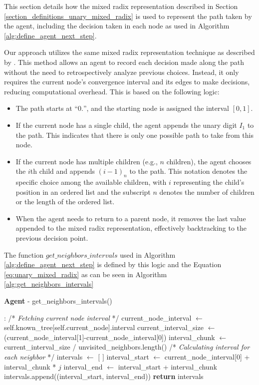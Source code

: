 This section details how the mixed radix representation described in Section \ref{section_definitions_unary_mixed_radix}
is used to represent the path taken by the agent, including the decision taken in each node as used in Algorithm \ref{alg:define_agent_next_step}.

Our approach utilizes the same mixed radix representation technique as described by .
This method allows an agent to record each decision made along the path without the need to retrospectively analyze previous choices.
Instead, it only requires the current node's convergence interval and its edges to make decisions, reducing computational overhead. This is based on the following logic:

\begin{itemize}
    \item The path starts at ``$0.$'', and the starting node is assigned the interval $[0,1]$.
    \item If the current node has a single child, the agent appends the unary digit $I_1$ to the path. This indicates that there is only one possible path to take from this node.
    \item If the current node has multiple children (e.g., $n$ children), the agent chooses the $i$th child and appends $(i-1)_n$ to the path. This notation denotes the specific choice among the available children, with $i$ representing the child's position in an ordered list and the subscript $n$ denotes the number of children or the length of the ordered list.
    \item When the agent needs to return to a parent node, it removes the last value appended to the mixed radix representation, effectively backtracking to the previous decision point.
\end{itemize}

The function $get\_neighbors\_intervals$ used in Algorithm \ref{alg:define_agent_next_step}
is defined by this logic and the Equation \ref{eq:unary_mixed_radix} as can be seen in Algorithm \ref{alg:get_neighbors_intervals}

\begin{algorithm}
\caption{\textbf{Agent} - get\_neighbors\_intervals()}
\label{alg:get_neighbors_intervals}
\begin{algorithmic}
    :
    \State /* \textit{Fetching current node interval } */
    \State current\_node\_interval $\gets$ self.known\_tree[self.current\_node].interval
    \State current\_interval\_size $\gets$ (current\_node\_interval[1]-current\_node\_interval[0])
    \State interval\_chunk $\gets$ current\_interval\_size / unvisited\_neighbors.length()
    \State
    \State /* \textit{Calculating interval for each neighbor} */
    \State intervals $\gets$ $[$ $ ]$
        \State interval\_start $\gets$ current\_node\_interval[0] + interval\_chunk * $j$
        \State interval\_end $\gets$ interval\_start + interval\_chunk
        \State intervals.append((interval\_start, interval\_end))
    \EndFor
    \State \textbf{return} intervals
    \EndProcedure
\end{algorithmic}
\end{algorithm}


